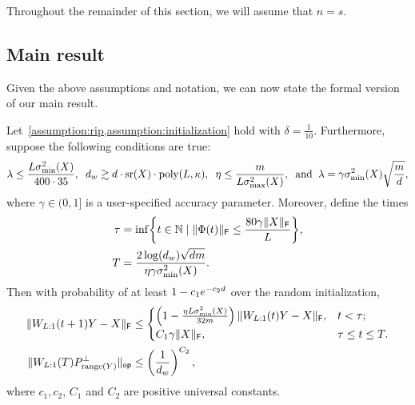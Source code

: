 Throughout the remainder of this section, we will assume that $n = s$.

\subsection{Main result}
\label{sec:subsec:main result formal}
Given the above assumptions and notation, we can now state the formal version of our main result.
\begin{theorem}
  \label{thm:mainresult-formal}
  Let~\cref{assumption:rip,assumption:initialization} hold
  with $\delta = \frac{1}{10}$. Furthermore, suppose the following conditions are true:
  \begin{equation}
      \lambda \leq
      \frac{L \sigma_{\min}^2(X)}{400 \cdot 35}, \;\;
      d_{w} \gtrsim d \cdot \operatorname{\mathrm{sr}}(X) \cdot \mathrm{poly}(L, \kappa), \;\;
      \eta \leq \frac{m}{L \sigma^2_{\max}(X)}, \;\; \text{and} \;\; \lambda = \gamma \sigma_{\min}^2(X) \sqrt{\frac{m}{d}},
      \label{eq:main-thm-assumptions}
  \end{equation}
  where $\gamma \in (0, 1]$ is a user-specified accuracy parameter.
  Moreover, define the times
	\begin{subequations}
		\begin{align}
			\tau & = \inf\set*{
				t \in \mathbb{N} \mid
				\frobnorm{\Phi(t)} \leq
				\frac{80 \gamma\frobnorm{X}}{L}
			},                                                                       \label{eq:tau def phi}\\
			T    & = \frac{2\log(\dhid)\sqrt{dm}}{\eta\gamma \sigma_{\min}^2(X)}. \label{eq:T def appendix}
		\end{align}
	\end{subequations}
Then with probability of at least $1-c_1 e^{-c_2 d}$  over the random initialization,
\begin{align}
		 \lVert W_{L:1}(t+1)Y - X\rVert_{\mathsf{F}} \label{eq:thm-regression-error-formal}
		 & \leq
		\begin{cases}
			\left(1 - \frac{\eta L \sigma_{\min}^2(X)}{32 m}\right) \lVert W_{L:1}(t)Y - X\rVert_{\mathsf{F}}, & t < \tau;        \\
			C_1 \gamma \lVert X\rVert_{\mathsf{F}} ,                                           & \tau \leq t \leq T.
		\end{cases}
		\\
		 \lVert W_{L:1}(T) P_{\mathrm{range}(Y)}^{\perp}\rVert_{\mathsf{op}}  
     &\leq \left( \frac{1}{d_{w}} \right)^{C_2},
		\label{eq:thm-generalization-error-formal}
	\end{align}
    where $c_1, c_2$, $C_1$ and $C_2$ are positive universal constants.
\end{theorem}
